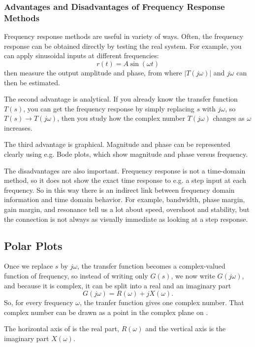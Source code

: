 \subsubsection{Advantages and Disadvantages of Frequency Response Methods}
Frequency response methods are useful in variety of ways.
Often, the frequency response can be obtained directly by testing the real system.
For example, you can apply sinusoidal inputs at different frequencies:
\begin{equation*}
  r(t) = A \sin (\omega t)
\end{equation*}
then measure the output amplitude and phase, from where $\left| T(j\omega) \right|$ and $j\omega$ can then be estimated. 

The second advantage is analytical.
If you already know the transfer function $T(s)$, you can get the frequency response by simply replacing $s$ with $j\omega$, so $T(s) \to T(j\omega)$, then you study how the complex number $T(j\omega)$ changes as $\omega$ increases.

The third advantage is graphical.
Magnitude and phase can be represented clearly using e.g. Bode plots, which show magnitude and phase versus frequency.

The disadvantages are also important.
Frequency response is not a time-domain method, so it does not show the exact time response to e.g. a step input at each frequency.
So in this way there is an indirect link between frequency domain information and time domain behavior.
For example, bandwidth, phase margin, gain margin, and resonance tell us a lot about speed, overshoot and stability, but the connection is not always as visually immediate as looking at a step response. 

\subsection{Polar Plots} \label{sec:polplot}
Once we replace $s$ by $j\omega$, the transfer function becomes a complex-valued function of frequency, so instead of writing only $G(s)$, we now write $G(j\omega)$, and because it is complex, it can be split into a real and an imaginary part
\begin{equation*}
  G(j\omega) = R(\omega) + j X(\omega)
.\end{equation*}
So, for every frequency $\omega$, the tranfer function gives one complex number.
That complex number can be drawn as a point in the complex plane on .

The horizontal axis of  is the real part, $R(\omega)$ and the vertical axis is the imaginary part $X(\omega)$.

